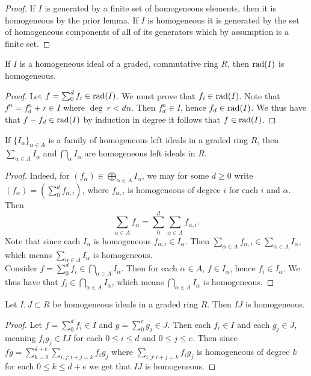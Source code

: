     \begin{proof}
        If $I$ is generated by a finite set of homogeneous elements, then it is homogeneous by the prior lemma. If $I$ is homogeneous it is generated by the set of homogeneous components of all of its generators which by assumption is a finite set.  
    \end{proof}
    \begin{proposition}
        If $I$ is a homogeneous ideal of a graded, commutative ring $R$, then $\mathrm{rad}(I)$ is homogeneous.  
    \end{proposition}
    \begin{proof}
        Let $f=\sum_0^d f_i \in \mathrm{rad}(I)$. We must prove that $f_i\in \mathrm{rad}(I)$. Note that $f^n = f_d^n + r\in I$ where $\deg \ r < dn$. Then $f_d^n\in I$, hence $f_d\in \mathrm{rad}(I)$. We thus have that $f - f_d \in \mathrm{rad}(I)$ by induction in degree it follows that $f\in \mathrm{rad}(I)$.
    \end{proof}
    \begin{lemma}
        If $\{I_\alpha\}_{\alpha\in A}$ is a family of homogeneous left ideals in a graded ring $R$, then $\sum_{\alpha\in A} I_\alpha$ and $\bigcap_{\alpha} I_\alpha$ are homogeneous left ideals in $R$.  
    \end{lemma}
    \begin{proof}
        Indeed, for $(f_\alpha)\in \bigoplus_{\alpha\in A} I_\alpha$, we may for some $d\geq 0$ write $(f_\alpha)=(\sum_0^d f_{\alpha,i})$, where $f_{\alpha,i}$ is homogeneous of degree $i$ for each $i$ and $\alpha$. Then 
        $$\sum_{\alpha\in A} f_\alpha = \sum_0^d \sum_{\alpha\in A} f_{\alpha,i}.$$
        Note that since each $I_\alpha$ is homogeneous $f_{\alpha,i}\in I_\alpha$. Then $\sum_{\alpha\in A} f_{\alpha,i}\in \sum_{\alpha\in A} I_\alpha$, which means $\sum_{\alpha\in A} I_\alpha$ is homogeneous.\\
        Consider $f=\sum_0^d f_i\in \bigcap_{\alpha\in A} I_\alpha$. Then for each $\alpha \in A$, $f\in I_\alpha$, hence $f_i\in I_\alpha$. We thus have that $f_i\in \bigcap_{\alpha\in A} I_\alpha$, which means $\bigcap_{\alpha \in A} I_\alpha$ is homogeneous.   
    \end{proof}
    \begin{lemma}
        Let $I,J\subset R$ be homogeneous ideals in a graded ring $R$. Then $IJ$ is homogeneous.
    \end{lemma}
    \begin{proof}
        Let $f=\sum_0^d f_i\in I$ and $g=\sum_0^e g_j\in J$. Then each $f_i\in I$ and each $g_j\in J$, meaning $f_ig_j\in IJ$ for each $0\leq i\leq d$ and $0\leq j\leq e$. Then since $fg = \sum_{k=0}^{d+e}\sum_{i,j:i+j= k} f_ig_j$ where $\sum_{i,j:i+j= k} f_ig_j$ is homogeneous of degree $k$ for each $0\leq k\leq d+e$ we get that $IJ$ is homogeneous.
    \end{proof}
